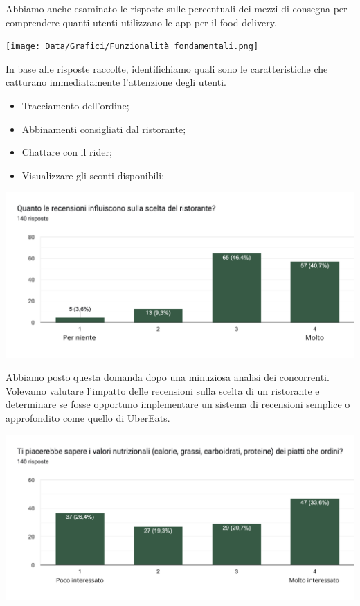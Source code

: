 \documentclass{article}
\begin{document}
\par Abbiamo anche esaminato le risposte sulle percentuali dei mezzi di consegna per comprendere quanti utenti utilizzano le app per il food delivery.\par \vspace{1cm}
\texttt{[image: Data/Grafici/Funzionalità\_fondamentali.png]}\par \newpage
In base alle risposte raccolte, identifichiamo quali sono le caratteristiche che catturano immediatamente l'attenzione degli utenti.
\par \begin{itemize}
    \item Tracciamento dell'ordine;
    \item Abbinamenti consigliati dal ristorante;
    \item Chattare con il rider;
    \item Visualizzare gli sconti disponibili;
\end{itemize}   \vspace{1cm} \par
\includegraphics[width=\textwidth]{Data/Grafici/influenza_recensioni.png}
\par Abbiamo posto questa domanda dopo una minuziosa analisi dei concorrenti. Volevamo valutare l'impatto delle recensioni sulla scelta di un ristorante e determinare se fosse opportuno implementare un sistema di recensioni semplice o approfondito come quello di UberEats.
    \par \vspace{1cm}\includegraphics[width=\textwidth]{Data/Grafici/val_nutrizionali.png}\par
\end{document}
